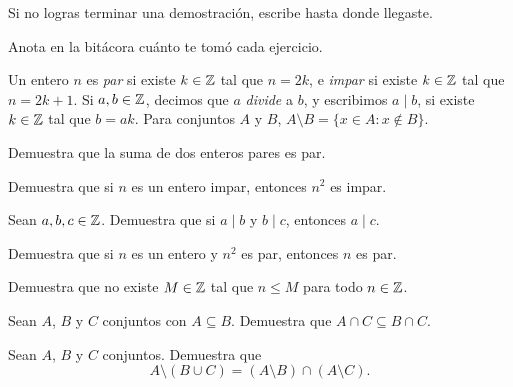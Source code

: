\documentclass[12pt,a4paper]{article}
\begin{document}
    \encabezado

    \begin{indicaciones}
        \item Si no logras terminar una demostración, escribe hasta donde llegaste.
        \item Anota en la bitácora cuánto te tomó cada ejercicio.
    \end{indicaciones}

    \begin{recordatorio}
        Un entero $n$ es \textit{par} si existe $k\in\mathbb{Z}$ tal que $n=2k$, e \textit{impar} si existe $k\in\mathbb{Z}$ tal que $n=2k+1$. Si $a,b\in\mathbb{Z}$, decimos que $a$ \textit{divide} a $b$, y escribimos $a\mid b$, si existe $k\in\mathbb{Z}$ tal que $b=ak$. Para conjuntos $A$ y $B$, $A\setminus B=\{x\in A:x\notin B\}$.
    \end{recordatorio}


    \begin{ejercicio}[1]
        Demuestra que la suma de dos enteros pares es par.
    \end{ejercicio}

    \begin{ejercicio}[1]
        Demuestra que si $n$ es un entero impar, entonces $n^2$ es impar.
    \end{ejercicio}

    \begin{ejercicio}[1]
        Sean $a,b,c\in\mathbb{Z}$. Demuestra que si $a\mid b$ y $b\mid c$, entonces $a\mid c$.
    \end{ejercicio}

    \begin{ejercicio}[2]
        Demuestra que si $n$ es un entero y $n^2$ es par, entonces $n$ es par.
    \end{ejercicio}

    \begin{ejercicio}[2]
        Demuestra que no existe $M\in\mathbb{Z}$ tal que $n\leq M$ para todo $n\in\mathbb{Z}$.
    \end{ejercicio}


    \begin{ejercicio}[1]
        Sean $A$, $B$ y $C$ conjuntos con $A\subseteq B$. Demuestra que $A\cap C\subseteq B\cap C$.
    \end{ejercicio}

    \begin{ejercicio}[2]
        Sean $A$, $B$ y $C$ conjuntos. Demuestra que
        \begin{equation*}
            A\setminus(B\cup C)=(A\setminus B)\cap(A\setminus C).
        \end{equation*}
    \end{ejercicio}
\end{document}
